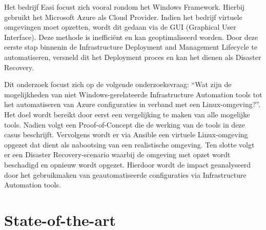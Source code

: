 Het bedrijf Easi focust zich vooral rondom het Windows Framework. Hierbij gebruikt het Microsoft Azure \autocite{Microsoft2022} als Cloud Provider. Indien het bedrijf virtuele omgevingen moet opzetten, wordt dit gedaan via de GUI (Graphical User Interface). Deze methode is inefficiënt en kan geoptimaliseerd worden. Door deze eerste stap binnenin de Infrastructure Deployment and Management Lifecycle te automatiseren, versneld dit het Deployment proces en kan het dienen als Disaster Recovery. 

Dit onderzoek focust zich op de volgende onderzoeksvraag: “Wat zijn de mogelijkheden van niet Windows-gerelateerde Infrastructure Automation tools tot het automatiseren van Azure configuraties in verband met een Linux-omgeving?”. Het doel wordt bereikt door eerst een vergelijking te maken van alle mogelijke tools. Nadien volgt een Proof-of-Concept die de werking van de tools in deze casus beschrijft. Vervolgens wordt er via Ansible een virtuele Linux-omgeving opgezet dat dient als nabootsing van een realistische omgeving. Ten slotte volgt er een Disaster Recovery-scenario waarbij de omgeving met opzet wordt beschadigd en opnieuw wordt opgezet. Hierdoor wordt de impact geanalyseerd door het gebruikmaken van geautomatiseerde configuraties via Infrastructure Automation tools.




\section{State-of-the-art}%
\label{sec:state-of-the-art}

